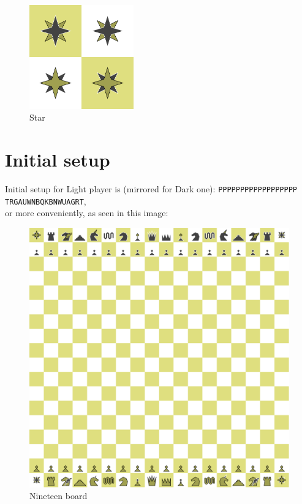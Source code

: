 \documentclass[a5paper,12pt,draft]{book} %
\begin{document}
\noindent
\begin{figure}
\includegraphics[width=0.4\textwidth, keepaspectratio=true]{../gfx/pieces/11_star.png}
\caption{Star}
\label{fig:star}
\end{figure}

\clearpage

\section*{Initial setup}

Initial setup for Light player is (mirrored for Dark one):
\texttt{PPPPPPPPPPPPPPPPPP \\
        TRGAUWNBQKBNWUAGRT}, \\
or more conveniently, as seen in this image:

\noindent
\begin{figure}[h]
\includegraphics[width=1.0\textwidth, keepaspectratio=true]{../gfx/boards/12_nineteen.png}
\caption{Nineteen board}
\label{fig:nineteen}
\end{figure}
\end{document}
